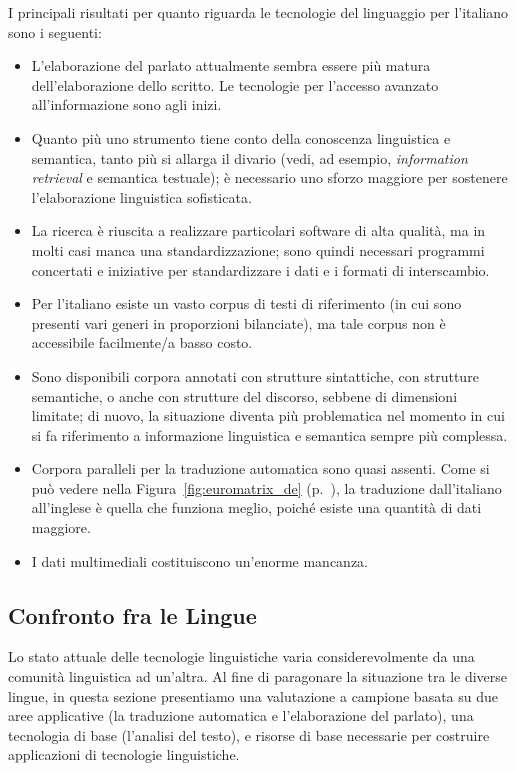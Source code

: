\documentclass[]{../../metanetpaper}
\begin{document}
\begin{multicols}{2}
I principali risultati per quanto riguarda le tecnologie del linguaggio per l'italiano sono i seguenti:


\begin{itemize}
\item L'elaborazione del parlato attualmente sembra essere pi\`{u} matura dell'elaborazione dello scritto. Le tecnologie per l'accesso avanzato all'informazione sono agli inizi.
\item Quanto pi\`{u} uno strumento tiene conto della conoscenza linguistica e semantica, tanto pi\`{u} si allarga il divario (vedi, ad esempio, \emph{information retrieval} e semantica testuale); \`{e} necessario uno sforzo maggiore per sostenere l'elaborazione linguistica sofisticata.
\item La ricerca \`{e} riuscita a realizzare particolari software di alta qualit\`{a}, ma in molti casi manca una standardizzazione; sono quindi necessari programmi concertati e iniziative per standardizzare i dati e i formati di interscambio.
\item Per l'italiano esiste un vasto corpus di testi di riferimento (in cui sono presenti vari generi in proporzioni bilanciate), ma tale corpus non \`{e} accessibile facilmente/a basso costo.
\item Sono disponibili corpora annotati con strutture sintattiche, con strutture semantiche, o anche con strutture del discorso, sebbene di dimensioni limitate; di nuovo, la situazione diventa pi\`{u} problematica nel momento in cui si fa riferimento a informazione linguistica e semantica sempre pi\`{u} complessa.
\item Corpora paralleli per la traduzione automatica sono quasi assenti. Come si pu\`{o} vedere nella Figura~\ref{fig:euromatrix_de} (p.~\pageref{fig:euromatrix_de}), la traduzione dall'italiano all'inglese \`{e} quella che funziona meglio, poich\'{e} esiste una quantit\`{a} di dati maggiore.
\item I dati multimediali costituiscono un'enorme mancanza.
\end{itemize}




\subsection{Confronto fra le Lingue}

Lo stato attuale delle tecnologie linguistiche varia considerevolmente da una
comunit\`{a} linguistica ad un'altra. Al fine di paragonare la situazione tra
le diverse lingue, in questa sezione presentiamo una valutazione a campione
basata su due aree applicative (la traduzione automatica e l'elaborazione del
parlato), una tecnologia di base (l'analisi del testo), e  risorse di base
necessarie per costruire applicazioni di tecnologie linguistiche.




\end{multicols}
\end{document}
